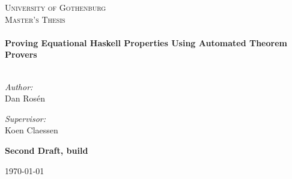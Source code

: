 \begin{titlepage}

\begin{center}


\vspace{4cm}

\textsc{\LARGE University of Gothenburg}\\[1.5cm]

\textsc{\Large Master's Thesis}\\[0.5cm]


\HRule \\[0.4cm]
{ \huge \bfseries Proving Equational Haskell Properties Using Automated Theorem Provers}\\[0.3cm]

\HRule \\[1.5cm]

\begin{minipage}{0.4\textwidth}
\begin{flushleft} \large
\emph{Author:}\\
Dan Rosén
\end{flushleft}
\end{minipage}
\begin{minipage}{0.4\textwidth}
\begin{flushright} \large
\emph{Supervisor:} \\
Koen Claessen
\end{flushright}
\end{minipage}

\vfill

{
\Large \textbf{Second Draft, build }

\vspace{2cm}

\large \today
}

\end{center}

\end{titlepage}
